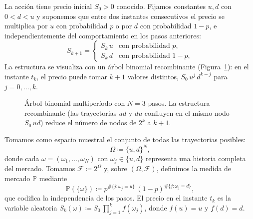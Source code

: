 \documentclass[11pt,a4paper,oneside]{report}
\theoremstyle{plain}
\theoremstyle{definition}
\theoremstyle{remark}
\newcommand{\PP}{\mathbb{P}}
\newcommand{\F}{\mathcal{F}}
\newcommand{\1}{\mathbf{1}}
\newcommand{\eqdef}{\coloneqq}
\begin{document}
La acción tiene precio
inicial $S_0 > 0$ conocido. Fijamos constantes $u, d$ con $0 < d < u$ y
suponemos que entre dos instantes consecutivos el precio se multiplica
por $u$ con probabilidad $p$ o por $d$ con probabilidad $1-p$, e
independientemente del comportamiento en los pasos anteriores:
\begin{equation*}
  S_{k+1} = \begin{cases}
    S_k\, u & \text{con probabilidad } p, \\[2pt]
    S_k\, d & \text{con probabilidad } 1 - p,
  \end{cases}
\end{equation*}
La estructura se visualiza con un árbol binomial recombinante
(Figura~\ref{fig:arbol_binomial}): en el instante $t_k$, el precio
puede tomar $k+1$ valores distintos, $S_0\, u^j\, d^{k-j}$ para $j = 0,
\ldots, k$.

\begin{figure}[h]
\centering
{}
\caption{Árbol binomial multiperíodo con $N = 3$ pasos. La estructura
recombinante (las trayectorias $ud$ y $du$ confluyen en el mismo nodo
$S_0\,ud$) reduce el número de nodos de $2^k$ a $k+1$.}
\label{fig:arbol_binomial}
\end{figure}

Tomamos como espacio
muestral el conjunto de todas las trayectorias posibles:
\begin{equation*}
  \Omega \eqdef \{u, d\}^N,
\end{equation*}
donde cada $\omega = (\omega_1, \ldots, \omega_N)$ con $\omega_j \in
\{u, d\}$ representa una historia completa del mercado. Tomamos $\F
\eqdef 2^{\Omega}$ y, sobre $(\Omega, \F)$, definimos la medida de
mercado $\PP$ mediante
\begin{equation*}
  \PP(\{\omega\}) \eqdef p^{\#\{j: \omega_j = u\}}\,
                        (1-p)^{\#\{j: \omega_j = d\}},
\end{equation*}
que codifica la independencia de los pasos. El precio en el instante
$t_k$ es la variable aleatoria $S_k(\omega) \eqdef S_0\, \prod_{j=1}^k
f(\omega_j)$, donde $f(u) = u$ y $f(d) = d$.
\end{document}
